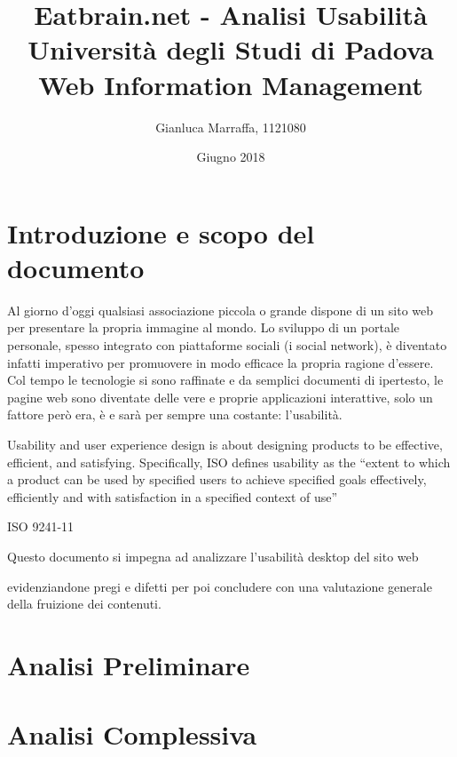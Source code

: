 \documentclass[10pt,a4paper]{article}
\title{
  Eatbrain.net - Analisi Usabilità \\
  Università degli Studi di Padova \\
  Web Information Management
}
\author{
  Gianluca Marraffa, 1121080
}
\date{Giugno 2018}
\newcommand{\URI}[3][blue]{\href{#2}{\color{#1}{#3}}}%
\begin{document}
\maketitle
\thispagestyle{empty}
\newpage
{}
\tableofcontents
\newpage
{}

\section{Introduzione e scopo del documento}
Al giorno d'oggi qualsiasi associazione piccola o grande dispone di un sito web per presentare la propria immagine al mondo. Lo sviluppo di un portale personale, spesso integrato con piattaforme sociali (i social network), è diventato infatti imperativo per promuovere in modo efficace la propria ragione d'essere. Col tempo le tecnologie si sono raffinate e da semplici documenti di ipertesto, le pagine web sono diventate delle vere e proprie applicazioni interattive, solo un fattore però era, è e sarà per sempre una costante: l'usabilità.
\setlength{\epigraphwidth}{0.8\textwidth}
\epigraph{Usability and user experience design is about designing products to be effective, efficient, and satisfying. Specifically, ISO defines usability as the “extent to which a product can be used by specified users to achieve specified goals effectively, efficiently and with satisfaction in a specified context of use”}{ISO 9241-11}
Questo documento si impegna ad analizzare l'usabilità desktop del sito web
\begin{center}
	\URI{https://eatbrain.net/}{eatbrain.net}
\end{center}
 evidenziandone pregi e difetti per poi concludere con una valutazione generale della fruizione dei contenuti.
\newpage

\section{Analisi Preliminare}

\section{Analisi Complessiva}
\label{sec-complessiva}

\end{document}
